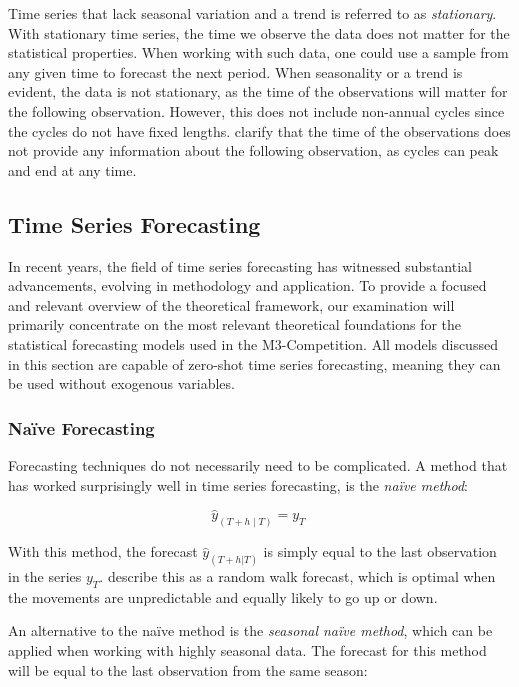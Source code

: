 \documentclass[12pt,a4paper]{article}
\begin{document}
Time series that lack seasonal variation and a trend is referred to as \textit{stationary}. With stationary time series, the time we observe the data does not matter for the statistical properties. When working with such data, one could use a sample from any given time to forecast the next period. When seasonality or a trend is evident, the data is not stationary, as the time of the observations will matter for the following observation. However, this does not include non-annual cycles since the cycles do not have fixed lengths. \cite{HyndmanForecasting2021} clarify that the time of the observations does not provide any information about the following observation, as cycles can peak and end at any time.

\subsection{Time Series Forecasting}
In recent years, the field of time series forecasting has witnessed substantial advancements, evolving in methodology and application. To provide a focused and relevant overview of the theoretical framework, our examination will primarily concentrate on the most relevant theoretical foundations for the statistical forecasting models used in the M3-Competition. All models discussed in this section are capable of zero-shot time series forecasting, meaning they can be used without exogenous variables.

\subsubsection{Naïve Forecasting} \label{naivesection}
Forecasting techniques do not necessarily need to be complicated. A method that has worked surprisingly well in time series forecasting, is the \textit{naïve method}:

\begin{equation}
  {\hat{y}}_{\left(T+h\middle| T\right)}=y_T\ 
  \label{naive}
\end{equation}

With this method, the forecast $\hat{y}_{(T+h|T)}$ is simply equal to the last observation in the series $y_T$.
 \cite{HyndmanForecasting2021} describe this as a random walk forecast, which is optimal when the movements are unpredictable and equally likely to go up or down.

An alternative to the naïve method is the \textit{seasonal naïve method}, which can be applied when working with highly seasonal data. The forecast for this method will be equal to the last observation from the same season:
\end{document}
